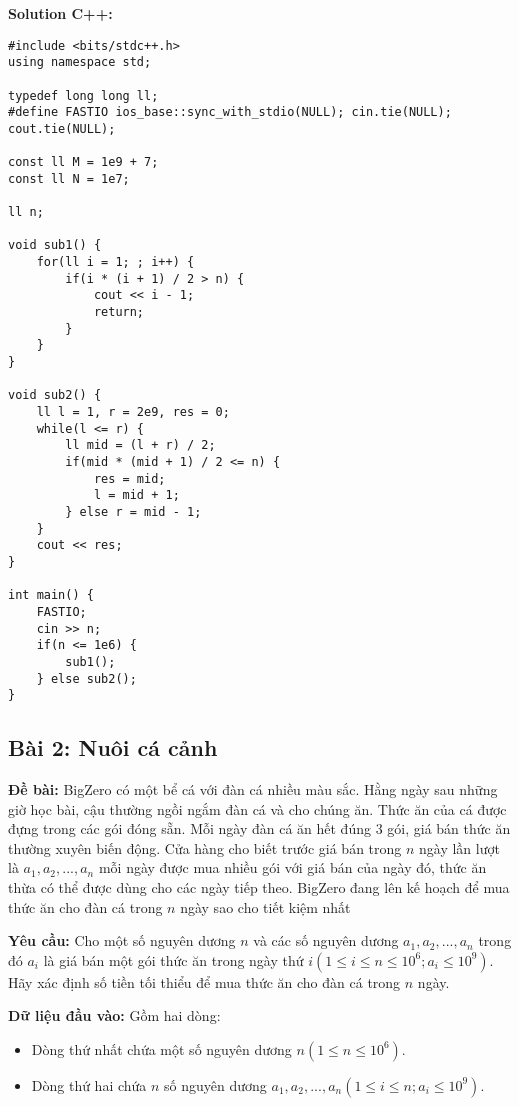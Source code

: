 \documentclass[12pt]{scrartcl}  %
\begin{document}
\textbf{Solution C++:}
\begin{lstlisting}
#include <bits/stdc++.h>
using namespace std;

typedef long long ll;
#define FASTIO ios_base::sync_with_stdio(NULL); cin.tie(NULL); cout.tie(NULL);

const ll M = 1e9 + 7;
const ll N = 1e7;

ll n;

void sub1() {
    for(ll i = 1; ; i++) {
        if(i * (i + 1) / 2 > n) {
            cout << i - 1;
            return;
        }
    }
}

void sub2() {
    ll l = 1, r = 2e9, res = 0;
    while(l <= r) {
        ll mid = (l + r) / 2;
        if(mid * (mid + 1) / 2 <= n) {
            res = mid;
            l = mid + 1;
        } else r = mid - 1;
    }
    cout << res;
}

int main() {
    FASTIO;
    cin >> n;
    if(n <= 1e6) {
        sub1();
    } else sub2();
}

\end{lstlisting}


\subsection{Bài 2: Nuôi cá cảnh}
\textbf{Đề bài:}
BigZero có một bể cá với đàn cá nhiều màu sắc. Hằng ngày sau những giờ học bài, cậu thường ngồi 
ngắm đàn cá và cho chúng ăn. Thức ăn của cá được đựng trong các gói đóng sẵn. Mỗi ngày đàn cá ăn hết đúng $3$ gói, giá bán thức ăn thường xuyên 
biến động. Cửa hàng cho biết trước giá bán trong $n$ ngày lần lượt là $a_1, a_2, ..., a_n$ mỗi ngày được mua nhiều gói với giá bán của ngày đó, thức ăn 
thừa có thể được dùng cho các ngày tiếp theo. BigZero đang lên kế hoạch để mua thức ăn cho đàn cá trong $n$ ngày sao cho tiết kiệm nhất 

\textbf{Yêu cầu:}
Cho một số nguyên dương $n$ và các số nguyên dương $a_1, a_2, ..., a_n$ trong đó $a_i$ là giá bán một gói thức ăn trong ngày thứ $i (1 \leq i \leq n \leq 10^6; a_i \leq 10^9)$. Hãy xác định số tiền tối thiểu để mua thức ăn cho đàn cá trong $n$ ngày. 

\textbf{Dữ liệu đầu vào:}
Gồm hai dòng:
\begin{itemize}
    \item Dòng thứ nhất chứa một số nguyên dương $n (1 \leq n \leq 10^6)$.
    \item Dòng thứ hai chứa $n$ số nguyên dương $a_1, a_2, ..., a_n (1 \leq i \leq n; a_i \leq 10^9)$.
\end{itemize}
\end{document}
